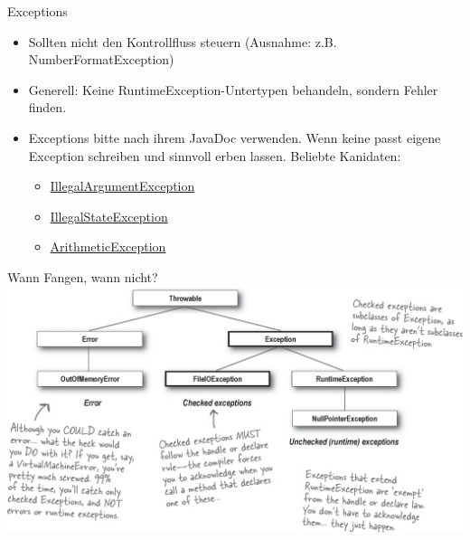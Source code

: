 \documentclass[aspectratio=169]{beamer}
\begin{document}
\begin{frame}
  \begin{block}{Exceptions}
    \begin{itemize}
      \pause
      \item Sollten nicht den Kontrollfluss steuern (Ausnahme: z.B. \color{classcolor}NumberFormatException\color{FGround})
      \pause
      \item Generell: Keine \color{classcolor}RuntimeException\color{FGround}-Untertypen behandeln, sondern Fehler finden.
      \pause
      \item Exceptions bitte nach ihrem JavaDoc verwenden. Wenn keine passt eigene Exception schreiben und sinnvoll erben lassen. \linebreak
      Beliebte Kanidaten:
      \begin{itemize}
        \pause
        \item \href{https://docs.oracle.com/en/java/javase/16/docs/api/java.base/java/lang/IllegalArgumentException.html}{IllegalArgumentException}
        \pause
        \item \href{https://docs.oracle.com/en/java/javase/16/docs/api/java.base/java/lang/IllegalStateException.html}{IllegalStateException}
        \pause
        \item \href{https://docs.oracle.com/en/java/javase/16/docs/api/java.base/java/lang/ArithmeticException.html}{ArithmeticException}
      \end{itemize}
    \end{itemize}
  \end{block}
\end{frame}

\begin{frame}{Wann Fangen, wann nicht?}
  \includegraphics[scale=0.28]{../images/when_which_exception.png}
\end{frame}
\end{document}
